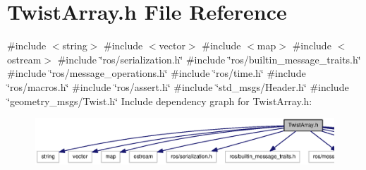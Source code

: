 \section{\-Twist\-Array.\-h \-File \-Reference}
\label{TwistArray_8h}
{\ttfamily \#include $<$string$>$}\*
{\ttfamily \#include $<$vector$>$}\*
{\ttfamily \#include $<$map$>$}\*
{\ttfamily \#include $<$ostream$>$}\*
{\ttfamily \#include \char`\"{}ros/serialization.\-h\char`\"{}}\*
{\ttfamily \#include \char`\"{}ros/builtin\-\_\-message\-\_\-traits.\-h\char`\"{}}\*
{\ttfamily \#include \char`\"{}ros/message\-\_\-operations.\-h\char`\"{}}\*
{\ttfamily \#include \char`\"{}ros/time.\-h\char`\"{}}\*
{\ttfamily \#include \char`\"{}ros/macros.\-h\char`\"{}}\*
{\ttfamily \#include \char`\"{}ros/assert.\-h\char`\"{}}\*
{\ttfamily \#include \char`\"{}std\-\_\-msgs/\-Header.\-h\char`\"{}}\*
{\ttfamily \#include \char`\"{}geometry\-\_\-msgs/\-Twist.\-h\char`\"{}}\*
\-Include dependency graph for \-Twist\-Array.\-h\-:
\nopagebreak
\begin{figure}[H]
\begin{center}
\leavevmode
\includegraphics[width=350pt]{TwistArray_8h__incl}
\end{center}
\end{figure}
